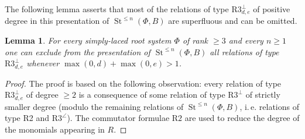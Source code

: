 \documentclass[oneside, 8pt]{amsart}
\newtheorem{lemma}{Lemma}
\theoremstyle{remark}
\theoremstyle{definition}
\numberwithin{lemma}{section}
\numberwithin{prop}{section}
\numberwithin{corollary}{section}
\numberwithin{externaltheorem}{section}
\DeclareMathOperator{\St}{St}
\numberwithin{equation}{section}
\begin{document}
The following lemma asserts that most of the relations of type $\text{R3}^\bot_{d,e}$ of positive degree in this presentation of $\St^{\leq n}(\Phi, B)$ 
 are superfluous and can be omitted.
\begin{lemma}\label{superfluous-relations}
 For every simply-laced root system $\Phi$ of rank $\geq 3$ and every $n \geq 1$ one can exclude from
 the presentation of $\St^{\leq n}(\Phi, B)$ all relations of type $\text{R3}_{d,e}^\bot$ whenever $\max(0,d) + \max(0,e) > 1$.
\end{lemma}
\begin{proof}
The proof is based on the following observation: every relation of type $\text{R3}^\bot_{d,e}$ of degree $\geq 2$ is a consequence of some relation of type $\text{R3}^\bot$ of strictly smaller degree (modulo the remaining relations of $\St^{\leq n}(\Phi, B)$, i.\,e. relations of type R2 and $\text{R3}^{\angle}$). The commutator formulae $\text{R2}$ are used to reduce the degree of the monomials appearing in $R$.
 

\end{proof}
\end{document}
